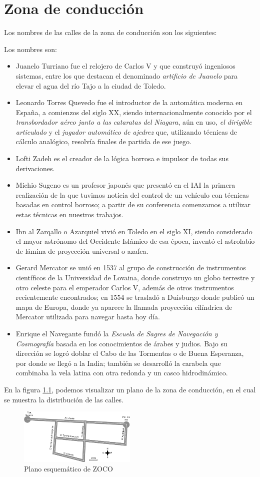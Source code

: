 \chapter{Zona de conducción}
\label{ape:zoco}

Los nombres de las calles de la zona de conducción son los siguientes:

Los nombres son:

\begin{itemize}
    \item Juanelo Turriano fue el relojero de Carlos V y que construyó ingeniosos sistemas, entre los que destacan el denominado \textit{artificio de Juanelo} para elevar el agua del río Tajo a la ciudad de Toledo.
    \item Leonardo Torres Quevedo fue el introductor de la automática moderna en España, a comienzos del siglo XX, siendo internacionalmente conocido por el \textit{transbordador aéreo junto a las cataratas del Niagara}, aún en uso, \textit{el dirigible articulado} y el \textit{jugador automático de ajedrez} que, utilizando técnicas de cálculo analógico, resolvía finales de partida de ese juego.
    \item Lofti Zadeh es el creador de la lógica borrosa e impulsor de todas sus derivaciones.
    \item Michio Sugeno es un profesor japonés que presentó en el IAI la primera realización de la que tuvimos noticia del control de un vehículo con técnicas basadas en control borroso; a partir de su conferencia comenzamos a utilizar estas técnicas en nuestros trabajos.
    \item Ibn al Zarqallo o Azarquiel vivió en Toledo en el siglo XI, siendo considerado el mayor astrónomo del Occidente Islámico de esa época, inventó el astrolabio de lámina de proyección universal o azafea.
    \item Gerard Mercator se unió en 1537 al grupo de construcción de instrumentos científicos de la Universidad de Lovaina, donde construyo un globo terrestre y otro celeste para el emperador Carlos V, además de otros instrumentos recientemente encontrados; en 1554 se trasladó a Duisburgo donde publicó un mapa de Europa, donde ya aparece la llamada proyección cilíndrica de Mercator utilizada para navegar hasta hoy día.
    \item Enrique el Navegante fundó la \textit{Escuela de Sagres de Navegación y Cosmografía} basada en los conocimientos de árabes y judios. Bajo su dirección se logró doblar el Cabo de las Tormentas o de Buena Esperanza, por donde se llegó a la India; también se desarrolló la carabela que combinaba la vela latina con otra redonda y un casco hidrodinámico.
\end{itemize}

En la figura \ref{fig:zocon}, podemos visualizar un plano de la zona de conducción, en el cual se muestra la distribución de las calles.
 
\begin{figure}[h]
  \centering
  \includegraphics[width=0.5\textwidth]{figures/zocon.png}
  \caption{Plano esquemático de ZOCO}
  \label{fig:zocon}
\end{figure}